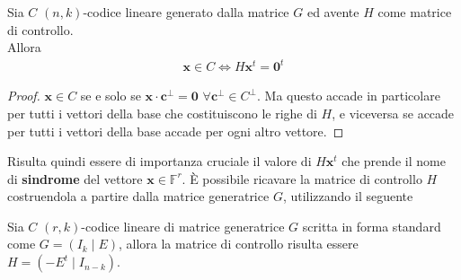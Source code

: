\begin{teorema}\label{teorFondMatrContrllo}
   Sia $C$ $(n,k)$-codice lineare generato dalla matrice $G$ ed avente $H$ come matrice di controllo.\\ 
   Allora
   \begin{align*}
      \mathbf{x} \in C \iff H \mathbf{x}^{t} = \mathbf{0}^{t}
   \end{align*}   
\end{teorema}
\begin{proof}
   $\mathbf{x}\in C$ se e solo se $\mathbf{x}\cdot \mathbf{c}^{\perp} = \mathbf{0}$ $\forall \mathbf{c}^{\perp} \in C^{\perp}$. Ma questo accade in particolare per tutti i vettori della base che costituiscono le righe di $H$, e viceversa se accade per tutti i vettori della base accade per ogni altro vettore.
\end{proof}
\noindent
Risulta quindi essere di importanza cruciale il valore di $H \mathbf{x}^{t}$ che prende il nome di {\bf sindrome} del vettore $\mathbf{x} \in \mathbb{F}^{r}$.
\noindent
È possibile ricavare la matrice di controllo $H$ costruendola a partire dalla matrice generatrice $G$, utilizzando il seguente
\begin{teorema}
   Sia $C$ $(r,k)$-codice lineare di matrice generatrice $G$ scritta in forma standard come $G = (I_{k} \mid E)$, allora la matrice di controllo risulta essere $H = (-E^{t} \mid I_{n-k})$.   
\end{teorema}

